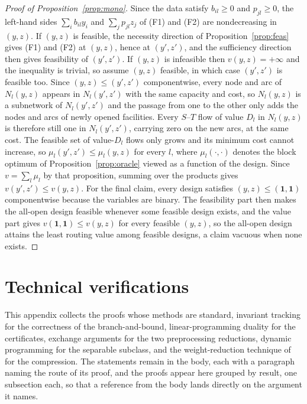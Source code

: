 \begin{proof}[Proof of Proposition~\ref{prop:mono}]
Since the data
satisfy $b_{il}\ge 0$ and $p_{jl}\ge 0$, the left-hand sides
$\sum_i b_{il}y_i$ and $\sum_j p_{jl}z_j$ of (F1) and (F2) are
nondecreasing in $(y,z)$. If $(y,z)$ is feasible, the necessity direction
of Proposition~\ref{prop:feas} gives (F1) and (F2) at $(y,z)$, hence at
$(y',z')$, and the sufficiency direction then gives feasibility of
$(y',z')$. If $(y,z)$ is infeasible then $v(y,z)=+\infty$ and the
inequality is trivial, so assume $(y,z)$ feasible, in which case
$(y',z')$ is feasible too. Since $(y,z)\le(y',z')$ componentwise, every
node and arc of $N_l(y,z)$ appears in $N_l(y',z')$ with the same capacity
and cost, so $N_l(y,z)$ is a subnetwork of $N_l(y',z')$ and the passage
from one to the other only adds the nodes and arcs of newly opened
facilities. Every $S$--$T$ flow of value $D_l$ in $N_l(y,z)$ is therefore
still one in $N_l(y',z')$, carrying zero on the new arcs, at the same
cost. The feasible set of value-$D_l$ flows only grows and its minimum
cost cannot increase, so $\mu_l(y',z')\le\mu_l(y,z)$ for every $l$, where
$\mu_l(\cdot,\cdot)$ denotes the block optimum of
Proposition~\ref{prop:oracle} viewed as a function of the design. Since
$v=\sum_l\mu_l$ by that proposition, summing over the products gives
$v(y',z')\le v(y,z)$. For the final claim, every design satisfies
$(y,z)\le(\mathbf 1,\mathbf 1)$ componentwise because the variables are
binary. The feasibility part then makes the all-open design feasible
whenever some feasible design exists, and the value part gives
$v(\mathbf 1,\mathbf 1)\le v(y,z)$ for every feasible $(y,z)$, so the
all-open design attains the least routing value among feasible designs,
a claim vacuous when none exists.
\end{proof}
\section{Technical verifications}\label{app:tech}

This appendix collects the proofs whose methods are standard, invariant
tracking for the correctness of the branch-and-bound, linear-programming
duality for the certificates, exchange arguments for the two
preprocessing reductions, dynamic programming for the separable
subclass, and the weight-reduction technique of \citet{FrankTardos1987}
for the compression. The statements remain in the body, each with a
paragraph naming the route of its proof, and the proofs appear here
grouped by result, one subsection each, so that a reference from the
body lands directly on the argument it names.

